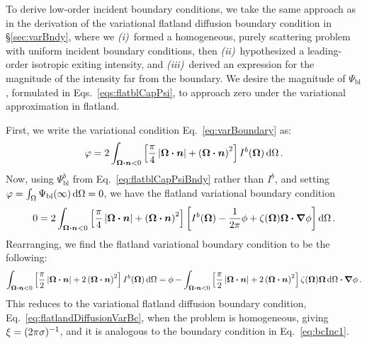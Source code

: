 To derive low-order incident boundary conditions, we take the same approach as
in the derivation of the variational flatland diffusion boundary condition in
\S\ref{sec:varBndy}, where we \textsl{(i)}~formed a homogeneous,
purely scattering problem with uniform incident boundary conditions, then
\textsl{(ii)}~hypothesized a leading-order isotropic exiting intensity, and
\textsl{(iii)}~derived an expression for the magnitude of the intensity far from
the boundary. We desire the magnitude of $\Psi_\mathrm{bl}$, formulated in 
Eqs.~\eqref{eqs:flatblCapPsi}, to approach zero under the variational
approximation in flatland.

First, we write the variational condition Eq.~\eqref{eq:varBoundary} as:
\begin{equation}\label{eq:varBoundaryGeneral}
  \varphi = 2 \int_{\bm{\Omega}\bm{\cdot} \bm{n} < 0}
  \left[ \frac{\pi}{4} \left| \bm{\Omega}\bm{\cdot} \bm{n} \right| + \left( \bm{\Omega}\bm{\cdot} \bm{n}
  \right)^2 \right] I^b(\bm{\Omega})
  \mathop{}\!\mathrm{d} \Omega\,.
\end{equation}
Now, using $\Psi_\mathrm{bl}^b$ from Eq.~\eqref{eq:flatblCapPsiBndy} rather than $I^b$,
and setting $\varphi=\int_\Omega \Psi_\mathrm{bl}(\infty)\mathop{}\!\mathrm{d}\Omega=0$,
we have the flatland variational boundary condition
\begin{equation*}%
  0 = 2 \int_{\vec{\Omega}\vd \vec{n} < 0}
  \left[ \frac{\pi}{4} \abs{\vec{\Omega}\vd \vec{n}}
  + \left( \vec{\Omega}\vd \vec{n}
  \right)^2 \right]
  \left[ I^b(\vec{\Omega}) - \frac{1}{2\pi} \phi
  + \zeta(\vec{\Omega}) \vec{\Omega}\vd \grad \phi \right]
  \ud \Omega\,.
\end{equation*}
Rearranging, we find the flatland variational boundary condition to be the
following:
\begin{equation}\label{eq:flatBcInc1}
  \int_{\bm{\Omega}\bm{\cdot} \bm{n} < 0}
  \left[ \frac{\pi}{2} \left| \bm{\Omega}\bm{\cdot} \bm{n} \right|
  + 2\left( \bm{\Omega}\bm{\cdot} \bm{n}
  \right)^2 \right] I^b(\bm{\Omega}) \mathop{}\!\mathrm{d} \Omega
  =
  \phi
  -
  \int_{\bm{\Omega}\bm{\cdot} \bm{n} < 0}
  \left[ \frac{\pi}{2} \left| \bm{\Omega}\bm{\cdot} \bm{n} \right|
  + 2\left( \bm{\Omega}\bm{\cdot} \bm{n} \right)^2 \right]
  \zeta(\bm{\Omega}) \bm{\Omega} \mathop{}\!\mathrm{d} \Omega \bm{\cdot} \bm{\nabla} \phi
  \,.
\end{equation}
This reduces to the variational flatland diffusion boundary
condition, Eq.~\eqref{eq:flatlandDiffusionVarBc}, when the problem is
homogeneous, giving $\xi=(2\pi\sigma)^{-1}$, and it is analogous to the boundary
condition in Eq.~\eqref{eq:bcInc1}.

